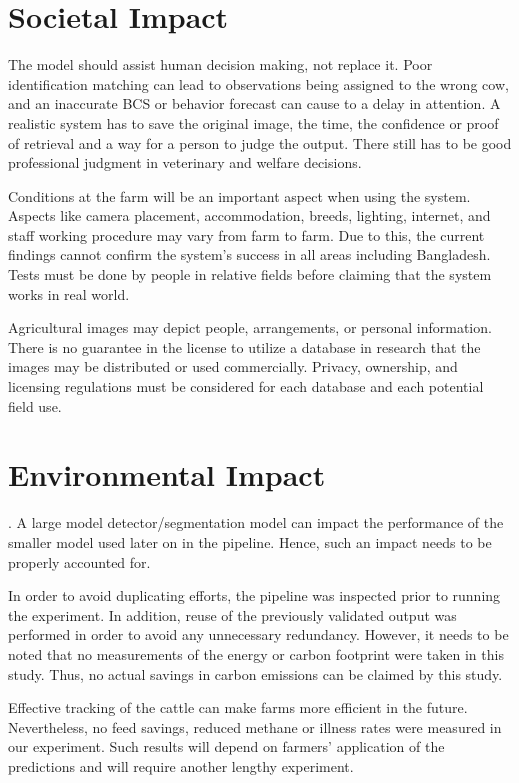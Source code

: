 \section{Societal Impact}



The model should assist human decision making, not replace it. Poor identification matching can lead to observations being assigned to the wrong cow, and an inaccurate BCS or behavior forecast can cause to a delay in attention. A realistic system has to save the original image, the time, the confidence or proof of retrieval and a way for a person to judge the output. There still has to be good professional judgment in veterinary and welfare decisions.

Conditions at the farm will be an important aspect when using the system. Aspects like camera placement, accommodation, breeds, lighting, internet, and staff working procedure may vary from farm to farm. Due to this, the current findings cannot confirm the system's success in all areas including Bangladesh. Tests must be done by people in relative fields before claiming that the system works in real world.

Agricultural images may depict people, arrangements, or personal information. There is no guarantee in the license to utilize a database in research that the images may be distributed or used commercially. Privacy, ownership, and licensing regulations must be considered for each database and each potential field use.

\section{Environmental Impact}

. A large model detector/segmentation model can impact the performance of the smaller model used later on in the pipeline. Hence, such an impact needs to be properly accounted for.

In order to avoid duplicating efforts, the pipeline was inspected prior to running the experiment. In addition, reuse of the previously validated output was performed in order to avoid any unnecessary redundancy.  However, it needs to be noted that no measurements of the energy or carbon footprint were taken in this study. Thus, no actual savings in carbon emissions can be claimed by this study.

Effective tracking of the cattle can make farms more efficient in the future. Nevertheless, no feed savings, reduced methane or illness rates were measured in our experiment. Such results will depend on farmers' application of the predictions and will require another lengthy experiment.

